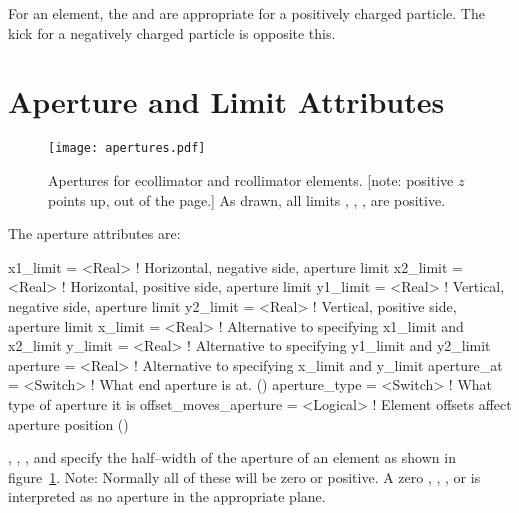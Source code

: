 For an  element, the  and  are appropriate for a positively
charged particle. The kick for a negatively charged particle is opposite this.

\section{Aperture and Limit Attributes}
\label{s:limit}

\begin{figure}[ht]
  \centering
  \texttt{[image: apertures.pdf]}
  \caption[Apertures for ecollimator and rcollimator elements.]
  {Apertures for ecollimator and rcollimator elements. 
  [note: positive $z$ points up, out of the page.] 
  As drawn, all limits , , 
  ,  are  positive.}  
  \label{f:limit}
\end{figure}

The aperture attributes are:
\begin{example}
  x1_limit      = <Real>      ! Horizontal, negative side, aperture limit
  x2_limit      = <Real>      ! Horizontal, positive side, aperture limit
  y1_limit      = <Real>      ! Vertical, negative side, aperture limit
  y2_limit      = <Real>      ! Vertical, positive side, aperture limit
  x_limit       = <Real>      ! Alternative to specifying x1_limit and x2_limit
  y_limit       = <Real>      ! Alternative to specifying y1_limit and y2_limit
  aperture      = <Real>      ! Alternative to specifying x_limit and y_limit
  aperture_at   = <Switch>    ! What end aperture is at. ()
  aperture_type = <Switch>    ! What type of aperture it is
  offset_moves_aperture = <Logical> ! Element offsets affect aperture position ()
\end{example}
, , , and  specify the half--width of the
aperture of an element as shown in figure~\ref{f:limit}. Note: Normally all of these will be zero or
positive. A zero , , , or  is interpreted as no
aperture in the appropriate plane.


